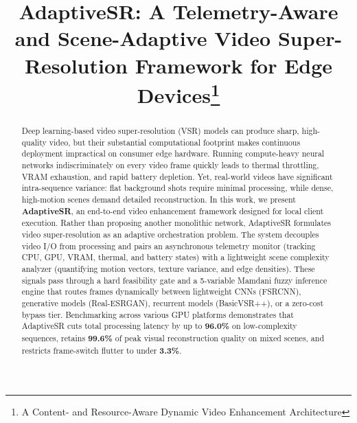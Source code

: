 \documentclass[conference]{IEEEtran}
\begin{document}
\title{AdaptiveSR: A Telemetry-Aware and Scene-Adaptive Video Super-Resolution Framework for Edge Devices\thanks{A Content- and Resource-Aware Dynamic Video Enhancement Architecture}}

\author{
\and
{}
\and
{}
}

\maketitle

\begin{abstract}
Deep learning-based video super-resolution (VSR) models can produce sharp, high-quality video, but their substantial computational footprint makes continuous deployment impractical on consumer edge hardware. Running compute-heavy neural networks indiscriminately on every video frame quickly leads to thermal throttling, VRAM exhaustion, and rapid battery depletion. Yet, real-world videos have significant intra-sequence variance: flat background shots require minimal processing, while dense, high-motion scenes demand detailed reconstruction. In this work, we present \textbf{AdaptiveSR}, an end-to-end video enhancement framework designed for local client execution. Rather than proposing another monolithic network, AdaptiveSR formulates video super-resolution as an adaptive orchestration problem. The system decouples video I/O from processing and pairs an asynchronous telemetry monitor (tracking CPU, GPU, VRAM, thermal, and battery states) with a lightweight scene complexity analyzer (quantifying motion vectors, texture variance, and edge densities). These signals pass through a hard feasibility gate and a 5-variable Mamdani fuzzy inference engine that routes frames dynamically between lightweight CNNs (FSRCNN), generative models (Real-ESRGAN), recurrent models (BasicVSR++), or a zero-cost bypass tier. Benchmarking across various GPU platforms demonstrates that AdaptiveSR cuts total processing latency by up to \textbf{96.0\%} on low-complexity sequences, retains \textbf{99.6\%} of peak visual reconstruction quality on mixed scenes, and restricts frame-switch flutter to under \textbf{3.3\%}.
\end{abstract}
\end{document}
